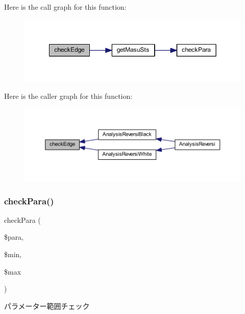 Here is the call graph for this function\+:\nopagebreak
\begin{figure}[H]
\begin{center}
\leavevmode
\includegraphics[width=349pt]{class_reversi_acd2c64ea43cc26407ad64920a183446b_cgraph}
\end{center}
\end{figure}
Here is the caller graph for this function\+:\nopagebreak
\begin{figure}[H]
\begin{center}
\leavevmode
\includegraphics[width=350pt]{class_reversi_acd2c64ea43cc26407ad64920a183446b_icgraph}
\end{center}
\end{figure}
\mbox{\label{class_reversi_ac8d57b64bc839c8bb1f53a2a5db11228}} 
\subsubsection{\texorpdfstring{check\+Para()}{checkPara()}}
{\footnotesize\ttfamily check\+Para (\begin{DoxyParamCaption}\item[{}]{\$para,  }\item[{}]{\$min,  }\item[{}]{\$max }\end{DoxyParamCaption})\hspace{0.3cm}{\ttfamily [private]}}



パラメーター範囲チェック 


